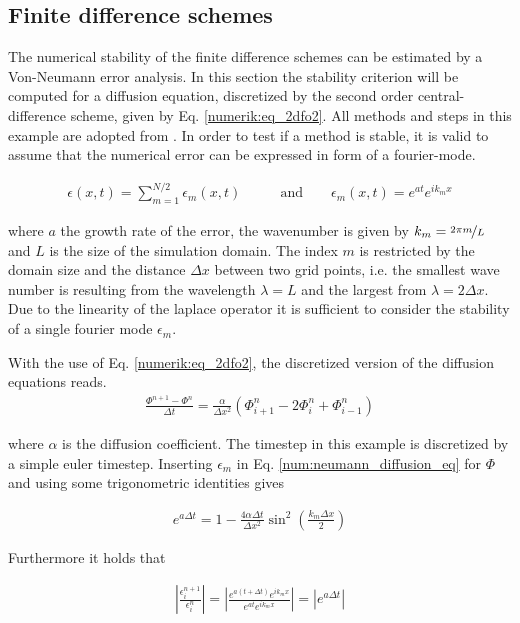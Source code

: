 \subsection{Finite difference schemes}

The numerical stability of the finite difference schemes can be estimated by a Von-Neumann error analysis.
In this section the stability criterion will be computed for a diffusion equation, discretized by
the second order central-difference scheme, given by Eq. \ref{numerik:eq_2dfo2}.
All methods and steps in this example are adopted from \citep{janderson}.
In order to test if a method is stable, it is valid to assume that the numerical error can be expressed in form of a fourier-mode.

\begin{align}
    \epsilon(x, t) = \sum_{m=1}^{N/2} \epsilon_m(x, t) \qquad &\text{and} \qquad  \epsilon_m(x, t) = e^{at}e^{i k_m x}
\end{align}

where $a$ the growth rate of the error, the wavenumber is given by $k_m=\nicefrac{2\pi m}{L}$ and $L$ is the size of the simulation domain.
The index $m$ is restricted by the domain size and the distance $\Delta x$ between two grid points, i.e. the smallest wave number
is resulting from the wavelength $\lambda=L$ and the largest from $\lambda=2\Delta x$.
Due to the linearity of the laplace operator it is sufficient to consider the stability of a single fourier mode $\epsilon_m$.

With the use of Eq.  \ref{numerik:eq_2dfo2}, the discretized version of the diffusion equations reads.
\begin{align}
    \label{num:neumann_diffusion_eq}
    \frac{\Phi^{n+1} - \Phi^n}{\Delta t} = \frac{\alpha}{\Delta x^2}\left(\Phi_{i+1}^n - 2\Phi_{i}^n + \Phi_{i-1}^n\right)
\end{align}

where $\alpha$ is the diffusion coefficient. The timestep in this example is discretized by a simple euler timestep.
Inserting $\epsilon_m$ in Eq. \ref{num:neumann_diffusion_eq} for $\Phi$ and using some trigonometric identities  gives

\begin{align}
    e^{a \Delta t} = 1 -  \frac{4\alpha \Delta t}{\Delta x^2} \sin^2\left(\frac{k_m \Delta x}{2}\right)
\end{align}

Furthermore it holds that

\begin{align}
    \left|\frac{\epsilon_i^{n+1}}{\epsilon_i^n}\right| =
    \left|\frac{e^{a(t + \Delta t)}e^{ik_mx}}{ e^{at}e^{ik_m x}}\right| = \left|e^{a\Delta t}\right|
\end{align}

